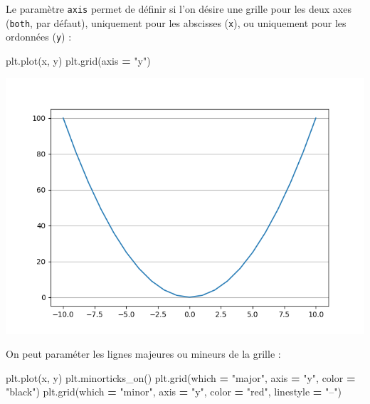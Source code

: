 \documentclass[12pt,]{book}
\newenvironment{Shaded}{\begin{snugshade}}{\end{snugshade}}
\newcommand{\StringTok}[1]{\textcolor[rgb]{0.31,0.60,0.02}{#1}}
\newcommand{\OperatorTok}[1]{\textcolor[rgb]{0.81,0.36,0.00}{\textbf{#1}}}
\newcommand{\NormalTok}[1]{#1}
\numberwithin{equation}{section}
\numberwithin{countremarque}{section}
\begin{document}
Le paramètre \texttt{axis} permet de définir si l'on désire une grille
pour les deux axes (\texttt{both}, par défaut), uniquement pour les
abscisses (\texttt{x}), ou uniquement pour les ordonnées (\texttt{y}) :

\begin{Shaded}
\begin{Highlighting}[]
\NormalTok{plt.plot(x, y)}
\NormalTok{plt.grid(axis }\OperatorTok{=} \StringTok{"y"}\NormalTok{)}
\end{Highlighting}
\end{Shaded}

\begin{center}\includegraphics[width=9.03in]{figs/pyplot/plot_grid_y} \end{center}

On peut paraméter les lignes majeures ou mineurs de la grille :

\begin{Shaded}
\begin{Highlighting}[]
\NormalTok{plt.plot(x, y)}
\NormalTok{plt.minorticks_on()}
\NormalTok{plt.grid(which }\OperatorTok{=} \StringTok{"major"}\NormalTok{, axis }\OperatorTok{=} \StringTok{"y"}\NormalTok{, color }\OperatorTok{=} \StringTok{"black"}\NormalTok{)}
\NormalTok{plt.grid(which }\OperatorTok{=} \StringTok{"minor"}\NormalTok{, axis }\OperatorTok{=} \StringTok{"y"}\NormalTok{, color }\OperatorTok{=} \StringTok{"red"}\NormalTok{, linestyle }\OperatorTok{=} \StringTok{"--"}\NormalTok{)}
\end{Highlighting}
\end{Shaded}
\end{document}

